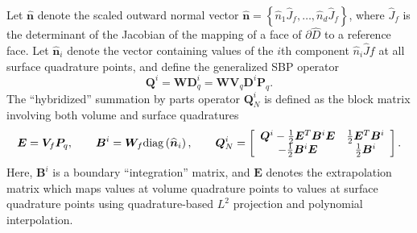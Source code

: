\documentclass{svjour3}                     %
\renewcommand{\hat}{\widehat}
\newcommand{\diag}[1]{{\rm diag}\LRp{#1}}
\newcommand{\pd}[2]{\frac{\partial#1}{\partial#2}}
\newcommand{\LRp}[1]{\left( #1 \right)}
\newcommand{\LRs}[1]{\left[ #1 \right]}
\newcommand{\LRc}[1]{\left\{ #1 \right\}}
\begin{document}
Let $\hat{\bm{n}}$ denote the scaled outward normal vector $\hat{\bm{n}} = \LRc{\hat{n}_1\hat{J}_f,\ldots,\hat{n}_d\hat{J}_f}$, where $\hat{J}_f$ is the determinant of the Jacobian of the mapping of a face of $\partial \hat{D}$ to a reference face.  Let $\hat{\bm{n}}_i$ denote the vector containing values of the $i$th component $\hat{n}_i\hat{J}f$ at all surface quadrature points, and define the generalized SBP operator 
\[
\bm{Q}^i = \bm{W}\bm{D}^i_q = \bm{W}\bm{V}_q\bm{D}^i\bm{P}_q.
\]
The ``hybridized'' summation by parts operator $\bm{Q}^i_N$ is defined as the block matrix involving both volume and surface quadratures
\begin{gather}
\bm{E} = \bm{V}_f\bm{P}_q, \qquad \bm{B}^i = \bm{W}_f \diag{\hat{\bm{n}}_i}, \qquad \bm{Q}^i_N  = \LRs{
\begin{array}{cc}
\bm{Q}^i - \frac{1}{2}\bm{E}^T\bm{B}^i\bm{E} &  \frac{1}{2}\bm{E}^T\bm{B}^i\\
-\frac{1}{2}\bm{B}^i\bm{E} & \frac{1}{2} \bm{B}^i
\end{array}}.  \label{eq:QN}
\end{gather}
Here, $\bm{B}^i$ is a boundary ``integration'' matrix, and $\bm{E}$ denotes the extrapolation matrix which maps values at volume quadrature points to values at surface quadrature points using quadrature-based $L^2$ projection and polynomial interpolation.  

\end{document}
